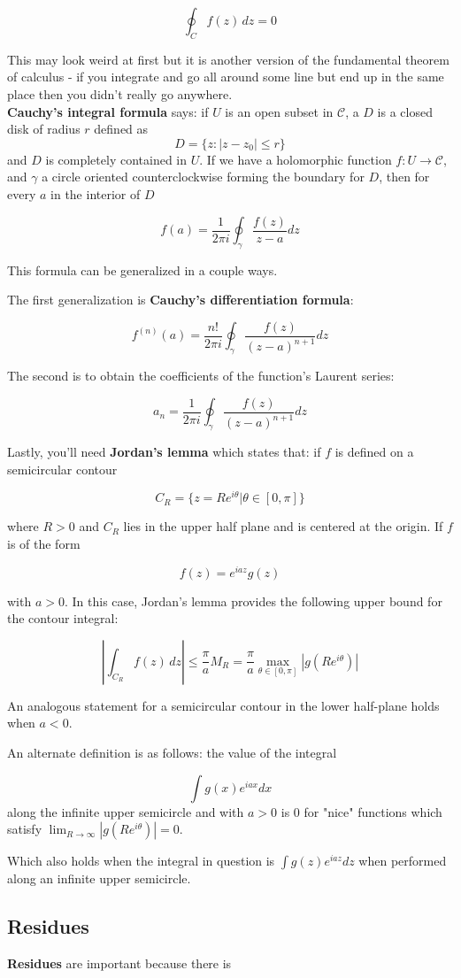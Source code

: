 $$
\oint_C f(z) \, dz = 0
$$

This may look weird at first but it is another version of the fundamental theorem of calculus -
if you integrate and go all around some line but end up in the same place then you didn't really go
anywhere.
\\

\textbf{Cauchy's integral formula} says:
if $U$ is an open subset in $\mathcal{C}$, a $D$ is a closed disk of radius $r$ defined as
$$
D = \{ z : |z - z_0| \leq r \}
$$
and $D$ is completely contained in $U$.
If we have a holomorphic function $f : U \rightarrow \mathcal{C}$, and $\gamma$ a circle oriented
counterclockwise forming the boundary for $D$,
then for every $a$ in the interior of $D$

$$
f(a) = \frac{1}{2\pi i} \oint_\gamma \frac{f(z)}{z-a} dz
$$

This formula can be generalized in a couple ways.

The first generalization is \textbf{Cauchy's differentiation formula}:

$$
f^{\left(n\right)}(a) = \frac{n!}{2\pi i} \oint_\gamma \frac{f(z)}{\left(z-a\right)^{n+1}} dz
$$

The second is to obtain the coefficients of the function's Laurent series:

$$
a_n = \frac{1}{2\pi i} \oint_\gamma \frac{f(z)}{\left(z-a\right)^{n+1}} dz
$$

Lastly, you'll need \textbf{Jordan's lemma} which states that:
if $f$ is defined on a semicircular contour

$$
C_{R} = \{ z = Re^{i\theta} | \theta \in [0, \pi] \}
$$

where $R > 0$ and $C_R$ lies in the upper half plane and is centered at the origin.
If $f$ is of the form

$$
f(z) = e^{iaz} g(z)
$$

with $a>0$.
In this case, Jordan's lemma provides the following upper bound for the contour integral:

$$
\left| \int_{C_{R}} f(z) \, dz \right| \leq \frac{\pi}{a} M_R
    = \frac{\pi}{a} \max_{\theta \in [0,\pi]} \left| g \left(Re^{i\theta}\right) \right|
$$

An analogous statement for a semicircular contour in the lower half-plane holds when $a < 0$. 

An alternate definition is as follows:
the value of the integral

$$
\int g(x) e^{iax} dx
$$
along the infinite upper semicircle and with $a>0$ is 0 for "nice" functions which satisfy
$\lim_{R\rightarrow \infty} \left| g\left(Re^{i\theta}\right) \right| = 0$.

Which also holds when the integral in question is $\int g(z) e^{iaz} dz$ when performed along
an infinite upper semicircle.

\subsection{Residues}

\textbf{Residues} are important because there is 